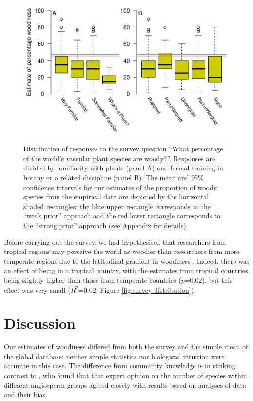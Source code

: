 \begin{figure}[p]
  \centering
  \includegraphics[width=\textwidth]{figs/survey-results}
  \caption[Survey results by familiarity and training]{Distribution of responses to the survey question ``What
    percentage of the world's vascular plant species are
    woody?''. Responses are divided by familiarity with plants
    (panel A) and formal training in botany or a related discipline
    (panel B). The mean and 95\% confidence intervals for our
    estimates of the proportion of woody species from the empirical
    data are depicted by the horizontal shaded rectangles; the blue
    upper rectangle corresponds to the ``weak prior'' approach and the
    red lower rectangle corresponds to the ``strong prior'' approach
    (see Appendix for details).}
  \label{fig:survey}
\end{figure}


Before carrying out the survey, we had hypothesised that researchers
from tropical regions may perceive the world as woodier than
researchers from more temperate regions due to the latitudinal
gradient in woodiness \citep{Molesheihgt}.
%
Indeed, there was an effect of being in a tropical country, with the
estimates from tropical countries being slightly higher than those
from temperate countries ($p$=0.02), but this effect was very small
($R^2$=0.02, Figure \ref{fig:survey-distribution}).

\section{Discussion}

Our estimates of woodiness differed from both the survey and the
simple mean of the global database: neither simple statistics nor
biologists' intuition were accurate in this case.  The difference from
community knowledge is in striking contrast to \citet{joppa2010}, who
found that that expert opinion on the number of species within
different angiosperm groups agreed closely with results based on
analyses of data and their bias.

